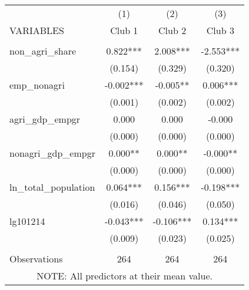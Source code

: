 \begin{tabular}{lccc} \hline
 & (1) & (2) & (3) \\
VARIABLES & Club 1 & Club 2 & Club 3 \\ \hline
 &  &  &  \\
non\_agri\_share & 0.822*** & 2.008*** & -2.553*** \\
 & (0.154) & (0.329) & (0.320) \\
emp\_nonagri & -0.002*** & -0.005** & 0.006*** \\
 & (0.001) & (0.002) & (0.002) \\
agri\_gdp\_empgr & 0.000 & 0.000 & -0.000 \\
 & (0.000) & (0.000) & (0.000) \\
nonagri\_gdp\_empgr & 0.000** & 0.000** & -0.000** \\
 & (0.000) & (0.000) & (0.000) \\
ln\_total\_population & 0.064*** & 0.156*** & -0.198*** \\
 & (0.016) & (0.046) & (0.050) \\
lg101214 & -0.043*** & -0.106*** & 0.134*** \\
 & (0.009) & (0.023) & (0.025) \\
 &  &  &  \\
 Observations & 264 & 264 & 264 \\ \hline
\multicolumn{4}{c}{ NOTE: All predictors at their mean value.} \\
\end{tabular}

